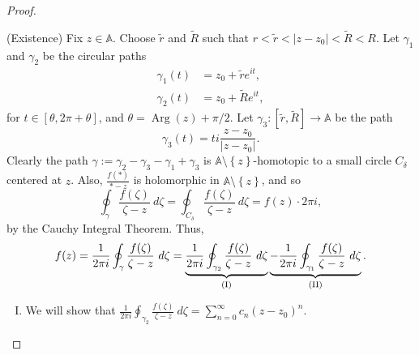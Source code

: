 \documentclass[12pt,openany]{book}
\theoremstyle{definition}
\newcommand{\set}[1]{\left\{#1\right\}}
\newcommand{\abs}[1]{\left\lvert #1 \right\rvert}
\newcommand{\Arg}{\operatorname{Arg}}
\begin{document}
\begin{proof}
\begin{center}
		\end{center}
		(Existence) Fix $z\in\mathbb{A}$. Choose $\tilde{r}$ and $\tilde{R}$ such that $r<\tilde{r}<\abs{z-z_0}<\tilde{R}<R$. Let $\gamma_1$ and $\gamma_2$ be the circular paths \begin{align*}
			\gamma_1(t)&=z_0+\tilde{r}e^{it},\\
			\gamma_2(t)&=z_0+\tilde{R}e^{it},
		\end{align*} for $t\in[\theta,2\pi+\theta]$, and $\theta=\Arg(z)+\pi/2$. Let $\gamma_3:[\tilde{r},\tilde{R}]\to\mathbb{A}$ be the path \[
		\gamma_3(t)=ti\frac{z-z_0}{\abs{z-z_0}}.
		\] Clearly the path $\gamma:=\gamma_2-\gamma_3-\gamma_1+\gamma_3$ is $\mathbb{A}\setminus\set{z}$-homotopic to a small circle $C_\delta$ centered at $z$. Also, $\frac{f(*)}{*-z}$ is holomorphic in $\mathbb{A}\setminus\set{z}$, and so \[
		\oint_\gamma\frac{f(\zeta)}{\zeta-z}\ d\zeta=\oint_{C_\delta}\frac{f(\zeta)}{\zeta-z}\ d\zeta=f(z)\cdot 2\pi i,
		\] by the Cauchy Integral Theorem. Thus, \[
		f(z)=\frac{1}{2\pi i}\oint_\gamma\frac{f(\zeta)}{\zeta-z}\ d\zeta=\underbrace{\frac{1}{2\pi i}\oint_{\gamma_2}\frac{f(\zeta)}{\zeta-z}\ d\zeta}_{\textnormal{(I)}}\underbrace{-\frac{1}{2\pi i}\oint_{\gamma_1}\frac{f(\zeta)}{\zeta-z}\ d\zeta}_{\textnormal{(II)}}.
		\]
		
		\begin{enumerate}[(I)]
			\item We will show that $\displaystyle\frac{1}{2\pi i}\oint_{\gamma_2}\frac{f(\zeta)}{\zeta-z}\ d\zeta=\sum_{n=0}^\infty c_n(z-z_0)^n$.
			

\end{enumerate}
\end{proof}
\end{document}
